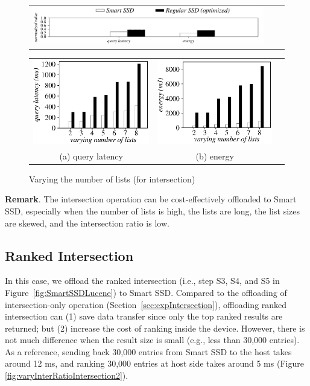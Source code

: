   \begin{figure}[htbp]
  \centering
    \begin{tabular}{ccc}
 \includegraphics[width=0.52\columnwidth]{figures/banner2.pdf}
\end{tabular}
\vspace{-0.1cm}
\renewcommand{\tabcolsep}{0.1mm}
  \begin{tabular}{ccc}
 \includegraphics[width=0.5\columnwidth]{figures/Intersection-time-VaryNumLists.eps}&
  \includegraphics[width=0.5\columnwidth]{figures/Intersection-energy-VaryNumLists.eps}\\
  (a) query latency & (b) energy
\end{tabular}
  \caption{Varying the number of lists (for intersection)}
  \label{fig:varyNumKeywordsIntersection}
 \end{figure}

\textbf{Remark}. The \textsf{intersection} operation can be cost-effectively offloaded to Smart SSD, especially when the number of lists is high, the lists are long, the list sizes are skewed, and the intersection ratio is low.

\subsection{Ranked Intersection}\label{sec:expRankedIntersection}
In this case, we offload the \textsf{ranked intersection} (i.e., step S3, S4, and S5 in Figure~\ref{fig:SmartSSDLucene}) to Smart SSD. Compared to the offloading of intersection-only operation (Section~\ref{sec:expIntersection}), offloading ranked intersection can (1) save data transfer since only the top ranked results are returned; but (2) increase the cost of ranking inside the device. However, there is not much difference when the result size is small (e.g., less than 30,000 entries). As a reference, sending back 30,000 entries from Smart SSD to the host takes around 12 ms, and ranking 30,000 entries at host side takes around 5 ms (Figure \protect\ref{fig:varyInterRatioIntersection2}).

